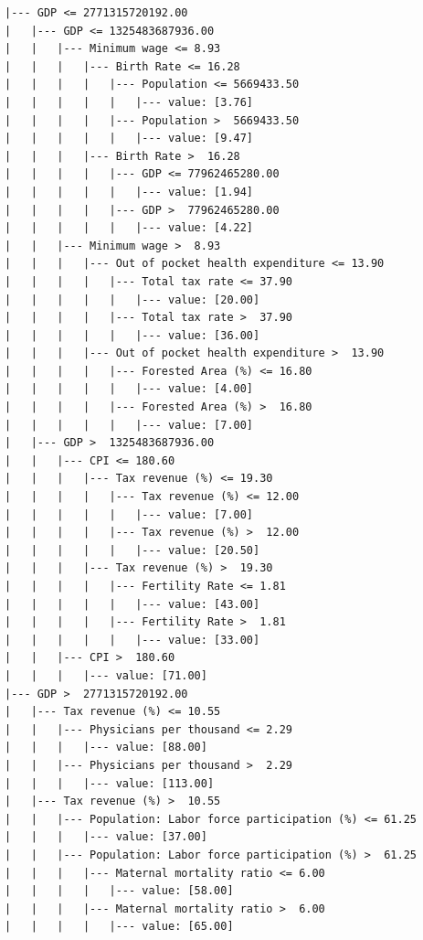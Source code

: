 \documentclass{article}
\begin{document}
\begin{lstlisting}[caption=Arbre sur les données de 2020]
|--- GDP <= 2771315720192.00
|   |--- GDP <= 1325483687936.00
|   |   |--- Minimum wage <= 8.93
|   |   |   |--- Birth Rate <= 16.28
|   |   |   |   |--- Population <= 5669433.50
|   |   |   |   |   |--- value: [3.76]
|   |   |   |   |--- Population >  5669433.50
|   |   |   |   |   |--- value: [9.47]
|   |   |   |--- Birth Rate >  16.28
|   |   |   |   |--- GDP <= 77962465280.00
|   |   |   |   |   |--- value: [1.94]
|   |   |   |   |--- GDP >  77962465280.00
|   |   |   |   |   |--- value: [4.22]
|   |   |--- Minimum wage >  8.93
|   |   |   |--- Out of pocket health expenditure <= 13.90
|   |   |   |   |--- Total tax rate <= 37.90
|   |   |   |   |   |--- value: [20.00]
|   |   |   |   |--- Total tax rate >  37.90
|   |   |   |   |   |--- value: [36.00]
|   |   |   |--- Out of pocket health expenditure >  13.90
|   |   |   |   |--- Forested Area (%) <= 16.80
|   |   |   |   |   |--- value: [4.00]
|   |   |   |   |--- Forested Area (%) >  16.80
|   |   |   |   |   |--- value: [7.00]
|   |--- GDP >  1325483687936.00
|   |   |--- CPI <= 180.60
|   |   |   |--- Tax revenue (%) <= 19.30
|   |   |   |   |--- Tax revenue (%) <= 12.00
|   |   |   |   |   |--- value: [7.00]
|   |   |   |   |--- Tax revenue (%) >  12.00
|   |   |   |   |   |--- value: [20.50]
|   |   |   |--- Tax revenue (%) >  19.30
|   |   |   |   |--- Fertility Rate <= 1.81
|   |   |   |   |   |--- value: [43.00]
|   |   |   |   |--- Fertility Rate >  1.81
|   |   |   |   |   |--- value: [33.00]
|   |   |--- CPI >  180.60
|   |   |   |--- value: [71.00]
|--- GDP >  2771315720192.00
|   |--- Tax revenue (%) <= 10.55
|   |   |--- Physicians per thousand <= 2.29
|   |   |   |--- value: [88.00]
|   |   |--- Physicians per thousand >  2.29
|   |   |   |--- value: [113.00]
|   |--- Tax revenue (%) >  10.55
|   |   |--- Population: Labor force participation (%) <= 61.25
|   |   |   |--- value: [37.00]
|   |   |--- Population: Labor force participation (%) >  61.25
|   |   |   |--- Maternal mortality ratio <= 6.00
|   |   |   |   |--- value: [58.00]
|   |   |   |--- Maternal mortality ratio >  6.00
|   |   |   |   |--- value: [65.00]

\end{lstlisting}
\end{document}

